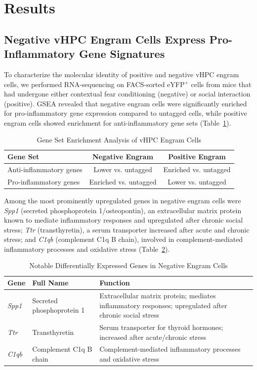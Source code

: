\documentclass[11pt]{article}
\begin{document}
\section{Results}

\subsection{Negative vHPC Engram Cells Express Pro-Inflammatory Gene Signatures}

To characterize the molecular identity of positive and negative vHPC engram cells, we performed RNA-sequencing on FACS-sorted eYFP$^+$ cells from mice that had undergone either contextual fear conditioning (negative) or social interaction (positive). GSEA revealed that negative engram cells were significantly enriched for pro-inflammatory gene expression compared to untagged cells, while positive engram cells showed enrichment for anti-inflammatory gene sets (Table~\ref{tab:gsea}).

\begin{table}[ht]
\centering
\caption{Gene Set Enrichment Analysis of vHPC Engram Cells}
\label{tab:gsea}
\begin{tabular}{lcc}
\toprule
\textbf{Gene Set} & \textbf{Negative Engram} & \textbf{Positive Engram} \\
\midrule
Anti-inflammatory genes & Lower vs. untagged & Enriched vs. untagged \\
Pro-inflammatory genes & Enriched vs. untagged & Lower vs. untagged \\
\bottomrule
\end{tabular}
\end{table}

Among the most prominently upregulated genes in negative engram cells were \textit{Spp1} (secreted phosphoprotein 1/osteopontin), an extracellular matrix protein known to mediate inflammatory responses and upregulated after chronic social stress; \textit{Ttr} (transthyretin), a serum transporter increased after acute and chronic stress; and \textit{C1qb} (complement C1q B chain), involved in complement-mediated inflammatory processes and oxidative stress (Table~\ref{tab:deg}).

\begin{table}[ht]
\centering
\caption{Notable Differentially Expressed Genes in Negative Engram Cells}
\label{tab:deg}
\begin{tabular}{llp{7cm}}
\toprule
\textbf{Gene} & \textbf{Full Name} & \textbf{Function} \\
\midrule
\textit{Spp1} & Secreted phosphoprotein 1 & Extracellular matrix protein; mediates inflammatory responses; upregulated after chronic social stress \\
\textit{Ttr} & Transthyretin & Serum transporter for thyroid hormones; increased after acute/chronic stress \\
\textit{C1qb} & Complement C1q B chain & Complement-mediated inflammatory processes and oxidative stress \\
\bottomrule
\end{tabular}
\end{table}
\end{document}
